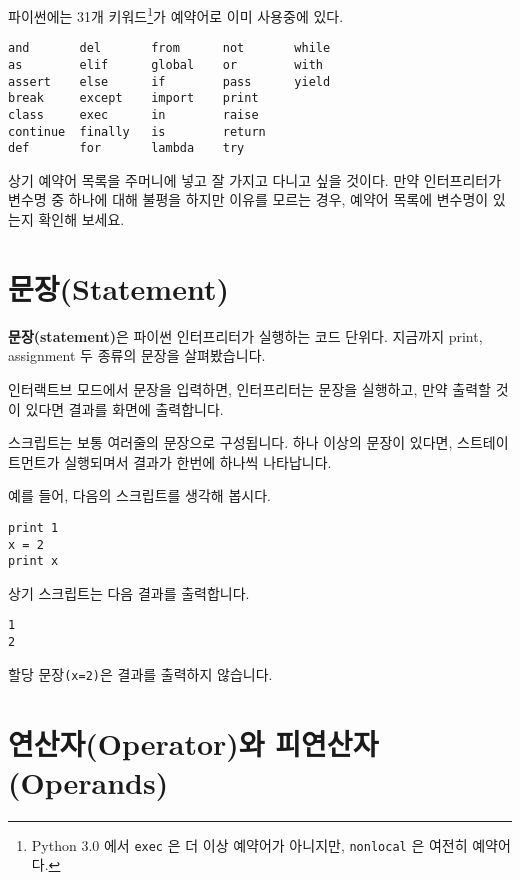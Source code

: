 파이썬에는 31개 키워드\footnote{Python 3.0 에서 {\tt exec} 은 더 이상 예약어가 아니지만, {\tt nonlocal} 은 여전히 예약어다.}가 예약어로 이미 사용중에 있다.

\beforeverb
\begin{verbatim}
and       del       from      not       while    
as        elif      global    or        with     
assert    else      if        pass      yield    
break     except    import    print              
class     exec      in        raise              
continue  finally   is        return             
def       for       lambda    try
\end{verbatim}
\afterverb
%

상기 예약어 목록을 주머니에 넣고 잘 가지고 다니고 싶을 것이다. 
만약 인터프리터가 변수명 중 하나에 대해 불평을 하지만 이유를 모르는 경우, 예약어 목록에 변수명이 있는지 확인해 보세요.

\section{문장(Statement)}

{\bf 문장(statement)}은 파이썬 인터프리터가 실행하는 코드 단위다. 지금까지 print, assignment 두 종류의 문장을 살펴봤습니다.


인터랙트브 모드에서 문장을 입력하면, 인터프리터는 문장을 실행하고, 만약 출력할 것이 있다면 결과를 화면에 출력합니다.

스크립트는 보통 여러줄의 문장으로 구성됩니다. 하나 이상의 문장이 있다면, 스트테이트먼트가 실행되며서 결과가 한번에 하나씩 나타납니다.

예를 들어, 다음의 스크립트를 생각해 봅시다.

\beforeverb
\begin{verbatim}
print 1
x = 2
print x
\end{verbatim}
\afterverb
%

상기 스크립트는 다음 결과를 출력합니다.

\beforeverb
\begin{verbatim}
1
2
\end{verbatim}
\afterverb
%

할당 문장{\tt (x=2)}은 결과를 출력하지 않습니다.

\section{연산자(Operator)와 피연산자(Operands)}

